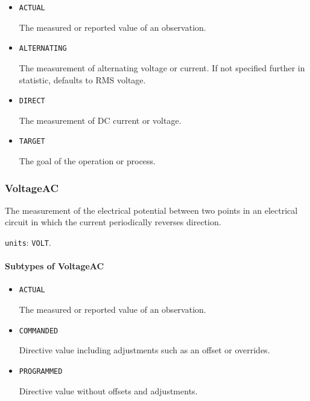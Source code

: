 \begin{itemize}

\item \texttt{ACTUAL}


The measured or reported value of an \gls{observation}.

\item \texttt{ALTERNATING}


The measurement of alternating voltage or current.   If not specified further in statistic, defaults to RMS voltage. 

\item \texttt{DIRECT}


The measurement of DC current or voltage.

\item \texttt{TARGET}


The goal of the operation or process.


\end{itemize}







\subsubsection{VoltageAC}
\label{sec:VoltageAC}



The measurement of the electrical potential between two points in an electrical circuit in which the current periodically reverses direction.


\texttt{units}: \texttt{VOLT}.

\paragraph{Subtypes of VoltageAC}\mbox{}
\label{sec:Subtypes of VoltageAC}

\begin{itemize}

\item \texttt{ACTUAL}


The measured or reported value of an \gls{observation}.

\item \texttt{COMMANDED}


Directive value including adjustments such as an offset or overrides.

\item \texttt{PROGRAMMED}


Directive value without offsets and adjustments.


\end{itemize}






